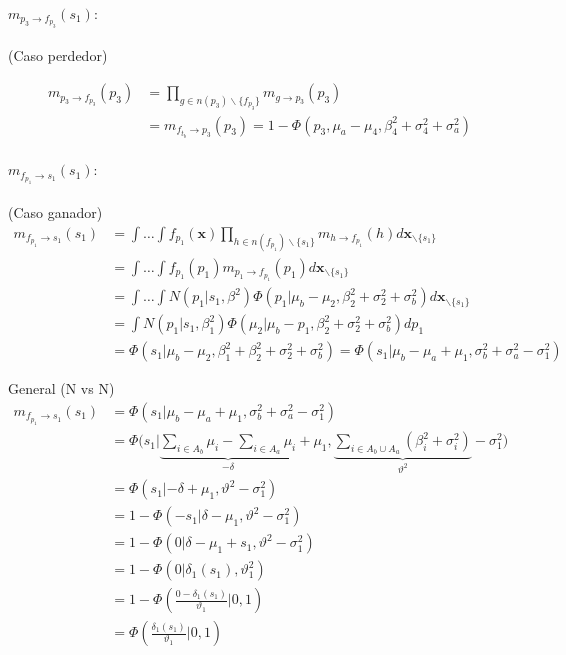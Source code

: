 \documentclass[11pt,twoside, spanish]{report} %
\begin{document}
\paragraph{$m_{p_3 \rightarrow f_{p_3}}(s_1):$} (Caso perdedor)

\begin{equation}
	\begin{split}
		m_{p_3 \rightarrow f_{p_3}}(p_3) &= \prod_{g \in n(p_3) \backslash  \{f_{p_3} \}} m_{g \rightarrow p_3} (p_3) \\
		&= m_{f_{t_b} \rightarrow p_3}(p_3)=  1 - \Phi(p_3, \mu_a  - \mu_4, \beta_4^2 + \sigma_4^2 + \sigma_a^2)
	\end{split}
\end{equation}

\paragraph{$m_{f_{p_1} \rightarrow s_1}(s_1):$} (Caso ganador)
\begin{equation}
	\begin{split}
		m_{f_{p_1} \rightarrow s_1}(s_1) & = \int \dots \int f_{p_1}(\textbf{x}) \prod_{h \in n(f_{p_1}) \backslash \{s_1\} } m_{h \rightarrow f_{p_1}}(h)  d\textbf{x}_{\backslash \{s_1\} }  \\
		&= \int \dots \int f_{p_1}(p_1)m_{p_1 \rightarrow f_{p_1}}(p_1) d\textbf{x}_{\backslash \{s_1\} }  \\
		&= \int \dots \int N(p_1| s_1, \beta^2)  \Phi(p_1| \mu_b - \mu_2, \beta_2^2 + \sigma_2^2 + \sigma_b^2 )  d\textbf{x}_{\backslash \{s_1\} }\\
		&= \int N(p_1| s_1, \beta_1^2)  \Phi(\mu_2| \mu_b -  p_1, \beta_2^2 + \sigma_2^2 + \sigma_b^2)  dp_1 \\
		&= \Phi(s_1| \mu_b - \mu_2, \beta_1^2+\beta_2^2 + \sigma_2^2 + \sigma_b^2) =\Phi(s_1| \mu_b - \mu_a + \mu_1, \sigma_b^2 +\sigma_a^2 - \sigma_1^2 )
	\end{split}
\end{equation}

General (N vs N)
\begin{equation}
	\begin{split}
		m_{f_{p_1} \rightarrow s_1}(s_1) & = \Phi(s_1| \mu_b - \mu_a + \mu_1, \sigma_b^2 +\sigma_a^2 - \sigma_1^2 )  \\
		& = \Phi\Big(s_1| \underbrace{\sum_{i \in A_b} \mu_i - \sum_{i \in A_a} \mu_i} _{ -\delta}  + \mu_1 , \underbrace{\sum_{i \in A_b \cup A_a} (\beta_i^2 + \sigma_i^2)}_{\vartheta^2} - \sigma_1^2 \Big) \\
		& = \Phi(s_1|-\delta + \mu_1,\vartheta^2-\sigma_1^2) \\
		& = 1- \Phi(-s_1|\delta - \mu_1 ,\vartheta^2-\sigma_1^2) \\
		& = 1- \Phi(0|\delta - \mu_1 + s_1 ,\vartheta^2-\sigma_1^2) \\
		& = 1- \Phi(0|\delta_1(s_1),\vartheta_1^2) \\
		&= 1- \Phi\left(\frac{0-\delta_1(s_1)}{\vartheta_1}|0,1\right)\\
		&= \Phi\left(\frac{\delta_1(s_1)}{\vartheta_1}|0,1\right)
	\end{split}
\end{equation}
\end{document}
